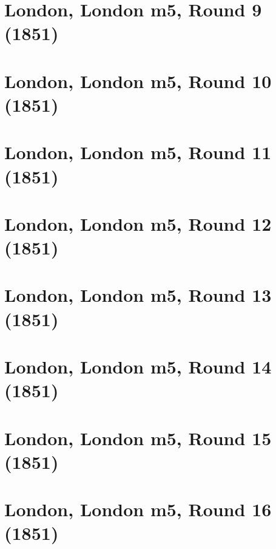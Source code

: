 \documentclass[11pt]{article}
\newcommand*\cleartoleftpage{%
   \clearpage
   \ifodd\value{page}\hbox{}\newpage\fi
}
\begin{document}
\cleartoleftpage

\section{London, London m5, Round 9 (1851)}


\cleartoleftpage

\section{London, London m5, Round 10 (1851)}


\cleartoleftpage

\section{London, London m5, Round 11 (1851)}


\cleartoleftpage

\section{London, London m5, Round 12 (1851)}


\cleartoleftpage

\section{London, London m5, Round 13 (1851)}


\cleartoleftpage

\section{London, London m5, Round 14 (1851)}


\cleartoleftpage

\section{London, London m5, Round 15 (1851)}


\cleartoleftpage

\section{London, London m5, Round 16 (1851)}

\end{document}
